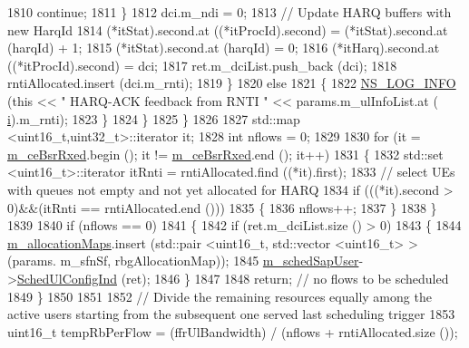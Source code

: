 \begin{DoxyCode}
1810                   \textcolor{keywordflow}{continue};
1811                 \}
1812               dci.m\_ndi = 0;
1813               \textcolor{comment}{// Update HARQ buffers with new HarqId}
1814               (*itStat).second.at ((*itProcId).second) = (*itStat).second.at (harqId) + 1;
1815               (*itStat).second.at (harqId) = 0;
1816               (*itHarq).second.at ((*itProcId).second) = dci;
1817               ret.m\_dciList.push\_back (dci);
1818               rntiAllocated.insert (dci.m\_rnti);
1819             \}
1820             \textcolor{keywordflow}{else}
1821             \{
1822               \hyperlink{group__logging_gafbd73ee2cf9f26b319f49086d8e860fb}{NS\_LOG\_INFO} (\textcolor{keyword}{this} << \textcolor{stringliteral}{" HARQ-ACK feedback from RNTI "} << params.m\_ulInfoList.at (
      \hyperlink{bernuolliDistribution_8m_a6f6ccfcf58b31cb6412107d9d5281426}{i}).m\_rnti);
1823             \}
1824         \}
1825     \}
1826 
1827   std::map <uint16\_t,uint32\_t>::iterator it;
1828   \textcolor{keywordtype}{int} nflows = 0;
1829 
1830   \textcolor{keywordflow}{for} (it = \hyperlink{classns3_1_1FdTbfqFfMacScheduler_a4affe9fe434a4cb87f5875ddf1766d61}{m\_ceBsrRxed}.begin (); it != \hyperlink{classns3_1_1FdTbfqFfMacScheduler_a4affe9fe434a4cb87f5875ddf1766d61}{m\_ceBsrRxed}.end (); it++)
1831     \{
1832       std::set <uint16\_t>::iterator itRnti = rntiAllocated.find ((*it).first);
1833       \textcolor{comment}{// select UEs with queues not empty and not yet allocated for HARQ}
1834       \textcolor{keywordflow}{if} (((*it).second > 0)&&(itRnti == rntiAllocated.end ()))
1835         \{
1836           nflows++;
1837         \}
1838     \}
1839 
1840   \textcolor{keywordflow}{if} (nflows == 0)
1841     \{
1842       \textcolor{keywordflow}{if} (ret.m\_dciList.size () > 0)
1843         \{
1844           \hyperlink{classns3_1_1FdTbfqFfMacScheduler_a5f22054304388f5f9469e3591b3bedea}{m\_allocationMaps}.insert (std::pair <uint16\_t, std::vector <uint16\_t> > (params.
      m\_sfnSf, rbgAllocationMap));
1845           \hyperlink{classns3_1_1FdTbfqFfMacScheduler_adba18bbdd7247045a60bda41322253c5}{m\_schedSapUser}->\hyperlink{classns3_1_1FfMacSchedSapUser_a1b89636256701a84d990db7db8aea874}{SchedUlConfigInd} (ret);
1846         \}
1847         
1848       \textcolor{keywordflow}{return};  \textcolor{comment}{// no flows to be scheduled}
1849     \}
1850 
1851 
1852   \textcolor{comment}{// Divide the remaining resources equally among the active users starting from the subsequent one served
       last scheduling trigger}
1853   uint16\_t tempRbPerFlow = (ffrUlBandwidth) / (nflows + rntiAllocated.size ());

\end{DoxyCode}
